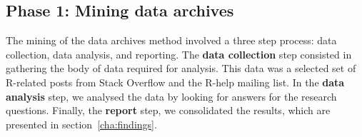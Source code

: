 \documentclass{sig-alternate-05-2015}
\begin{document}
%
%
%


\subsection{Phase 1: Mining data archives} 
\label{sec:studyDesign}

	The mining of the data archives method involved a three step process: data collection, data analysis, and reporting.%
	The \textbf{data collection} step consisted in gathering the body of data required for analysis.
	This data was a selected set of R-related posts from Stack Overflow and the R-help mailing list.
	In the \textbf{data analysis} step, we analysed the data by looking for answers for the research questions.
	Finally, the \textbf{report} step, we consolidated the results, which are presented in section~\ref{cha:findings}.
\end{document}

